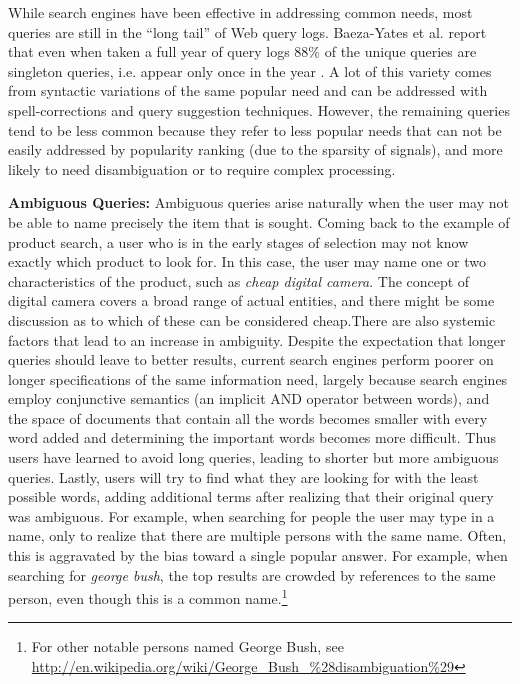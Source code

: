 While search engines have been effective in addressing common needs, most queries are still in the ``long tail'' of Web query logs. Baeza-Yates et al. report that even when taken a full year of query logs 88\% of the unique queries are singleton queries, i.e. appear only once in the year \cite{baeza07sigir}. A lot of this variety comes from syntactic variations of the same popular need and can be addressed with spell-corrections and query suggestion techniques. However, the remaining queries tend to be less common because they refer to less popular needs that can not be easily addressed by popularity ranking (due to the sparsity of signals), and more likely to need disambiguation or to require complex processing.

	\textbf{Ambiguous Queries:} 
	Ambiguous queries arise naturally when the user may not be able to name precisely the item that is sought. Coming back to the example of product search, a user who is in the early stages of selection may not know exactly which product to look for. In this case, the user may name one or two characteristics of the product, such as \emph{cheap digital camera}. The concept of digital camera covers a broad range of actual entities, and there might be some discussion as to which of these can be considered cheap.There are also systemic factors that lead to an increase in ambiguity. Despite the expectation that longer queries should leave to better results, current search engines perform poorer on longer specifications of the same information need, largely because search engines employ conjunctive semantics (an implicit AND operator between words), and the space of documents that contain all the words becomes smaller with every word added and determining the important words becomes more difficult. Thus users have learned to avoid long queries, leading to shorter but more ambiguous queries. Lastly, users will try to find what they are looking for with the least possible words, adding additional terms after realizing that their original query was ambiguous. For example, when searching for people the user may type in a name, only to realize that there are multiple persons with the same name. Often, this is aggravated by the bias toward a single popular answer. For example, when searching for \emph{george bush}, the top results are crowded by references to the same person, even though this is a common name.\footnote{For other notable persons named George Bush, see \url{http://en.wikipedia.org/wiki/George_Bush_\%28disambiguation\%29}}
			
